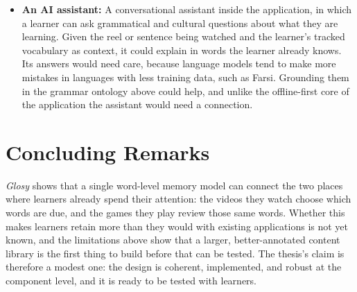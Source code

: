 \begin{sloppypar}
\begin{itemize}
        \item \textbf{An AI assistant:} A conversational assistant inside the application, in which a learner can ask grammatical and cultural questions about what they are learning. Given the reel or sentence being watched and the learner's tracked vocabulary as context, it could explain in words the learner already knows. Its answers would need care, because language models tend to make more mistakes in languages with less training data, such as Farsi. Grounding them in the grammar ontology above could help, and unlike the offline-first core of the application the assistant would need a connection.
    \end{itemize}
    \end{sloppypar}

\section{Concluding Remarks}
\label{sec:concluding_remarks}
    \textit{Glosy} shows that a single word-level memory model can connect the two places where learners already spend their attention: the videos they watch choose which words are due, and the games they play review those same words. Whether this makes learners retain more than they would with existing applications is not yet known, and the limitations above show that a larger, better-annotated content library is the first thing to build before that can be tested. The thesis's claim is therefore a modest one: the design is coherent, implemented, and robust at the component level, and it is ready to be tested with learners.

\newpage
